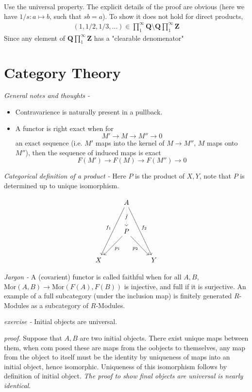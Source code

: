 \documentclass[11pt]{article}
\theoremstyle{definition}
\newcommand{\mor}{\text{Mor}}
\begin{document}
    Use the universal property. The explicit details of the proof are obvious (here we have \(1/s: a \mapsto b\), such that \(sb = a\)). To show it does not hold for direct products,
    \begin{align*}
        (1,1/2,1/3,\hdots) \in \prod_1^\infty \mathbf{Q} \setminus \mathbf{Q}\prod_1^\infty \mathbf{Z}
    \end{align*}
    Since any element of \(\mathbf{Q}\prod_1^\infty \mathbf{Z}\) has a "clearable denomenator"

    \newpage
    \section{Category Theory}

    \emph{General notes and thoughts - }
    \begin{itemize}
        \item Contravarience is naturally present in a pullback.
        \item A functor is right exact when for 
        \[M' \to M \to M'' \to 0\]
        an exact sequence (i.e. \(M'\) maps into the kernel of \(M \to M''\), \(M\) maps onto \(M''\)), then the sequence of induced maps is exact
        \[F(M') \to F(M) \to F(M'') \to 0\]
    \end{itemize}

    \emph{Categorical definition of a product -} Here \(P\) is the product of \(X,Y\), note that \(P\) is determined up to unique isomorphism.

    \begin{equation*}
        \begin{tikzcd}[row sep=1cm]
            &A\arrow[ddl,"f_1"']\arrow[ddr,"f_2"]\arrow[d,dotted,"\bar{f}" description]\\
            &P\arrow[dl,"p_1"]\arrow[dr,"p_2"']\\
            X&&Y
          \end{tikzcd}
    \end{equation*}

    \emph{Jargon - } A (covarient) functor is called faithful when for all \(A,B\), \(\mor(A,B) \to \mor(F(A),F(B))\) is injective, and full if it is surjective.
    An example of a full subcategory (under the inclusion map) is finitely generated \(R\)-Modules as a subcategory of \(R\)-Modules.

    \emph{exercise - } Initial objects are universal. 
    
    \emph{proof.} Suppose that \(A, B\) are two initial objects. There exist unique maps between them, when com posed these are maps from the oobjects to themselves, any map from the object to itself must be the identity by uniqueness of maps into an initial object, hence isomorphic. Uniqueness of this isomorphism follows by definition of initial object. \emph{The proof to show final objects are universal is nearly identical}.
\end{document}
